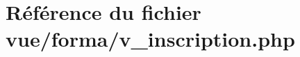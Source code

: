 \hypertarget{v__inscription_8php}{}\section{Référence du fichier vue/forma/v\+\_\+inscription.php}
\label{v__inscription_8php}
